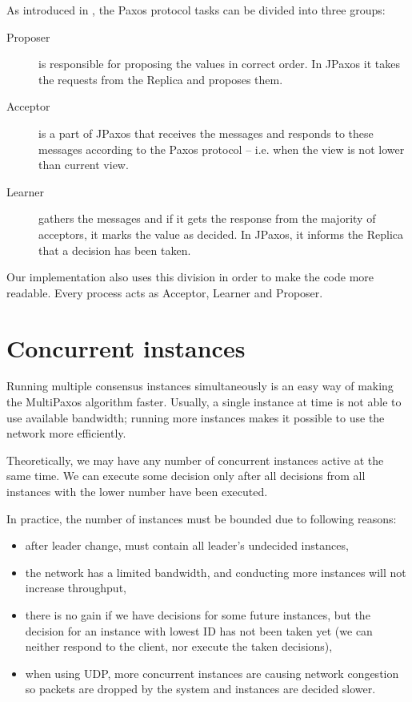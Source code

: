 As introduced in \cite{Lam01}, the Paxos protocol tasks can be divided into three groups:
\begin{description}
 \item[Proposer] is responsible for proposing the values in correct order. In JPaxos it takes the requests from the Replica and proposes them.
 
 \item[Acceptor] is a part of JPaxos that receives the \propose messages and responds to these messages according to the Paxos protocol -- i.e. when the view is not lower than current view.
 
 \item[Learner] gathers the \accept messages and if it gets the response from the majority of acceptors, it marks the value as decided. In JPaxos, it informs the Replica that a decision has been taken.
\end{description}

Our implementation also uses this division in order to make the code more readable. Every process acts as Acceptor, Learner and Proposer.

\section{Concurrent instances}
\label{subsec:concurrent_instances}
Running multiple consensus instances simultaneously is an easy way of making the MultiPaxos algorithm faster. Usually, a single instance at time is not able to use available bandwidth; running more instances makes it possible to use the network more efficiently.

Theoretically, we may have any number of concurrent instances active at the same time. We can execute some decision only after all decisions from all instances with the lower number have been executed.

In practice, the number of instances must be bounded due to following reasons:
\begin{itemize} 
  \item after leader change, \prepareOK must contain all leader's undecided instances,
  \item the network has a limited bandwidth, and conducting more instances will not increase throughput,
  \item there is no gain if we have decisions for some future instances, but the decision for an instance with lowest ID has not been taken yet (we can neither respond to the client, nor execute the taken decisions),
  \item when using UDP, more concurrent instances are causing network congestion so packets are dropped by the system and instances are decided slower.
\end{itemize}

